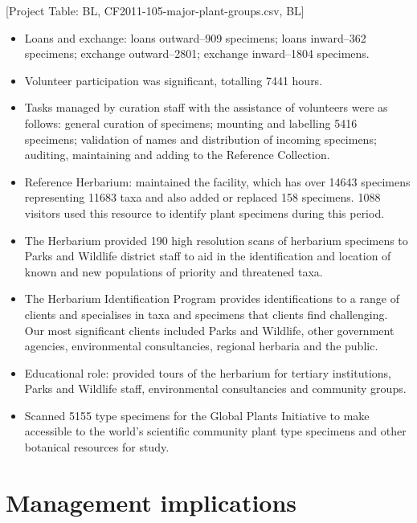 \documentclass[version=last,
    paper=a4, %
    10pt, %
    usenames,
    dvipsnames,
    oneside, %
    headings=openany, %
    DIV=15 %
]{scrbook}
\begin{document}
{[}Project Table: BL, CF2011-105-major-plant-groups.csv, BL{]}

\begin{itemize}
\itemsep1pt\parskip0pt
\item
  Loans and exchange: loans outward--909 specimens; loans inward--362
  specimens; exchange outward--2801; exchange inward--1804 specimens.
\item
  Volunteer participation was significant, totalling 7441 hours.
\item
  Tasks managed by curation staff with the assistance of volunteers were
  as follows: general curation of specimens; mounting and labelling 5416
  specimens; validation of names and distribution of incoming specimens;
  auditing, maintaining and adding to the Reference Collection.
\item
  Reference Herbarium: maintained the facility, which has over 14643
  specimens representing 11683 taxa and also added or replaced 158
  specimens. 1088 visitors used this resource to identify plant
  specimens during this period.
\item
  The Herbarium provided 190 high resolution scans of herbarium
  specimens to Parks and Wildlife district staff to aid in the
  identification and location of known and new populations of priority
  and threatened taxa.
\item
  The Herbarium Identification Program provides identifications to a
  range of clients and specialises in taxa and specimens that clients
  find challenging. Our most significant clients included Parks and
  Wildlife, other government agencies, environmental consultancies,
  regional herbaria and the public.
\item
  Educational role: provided tours of the herbarium for tertiary
  institutions, Parks and Wildlife staff, environmental consultancies
  and community groups.
\item
  Scanned 5155 type specimens for the Global Plants Initiative to make
  accessible to the world's scientific community plant type specimens
  and other botanical resources for study.
\end{itemize}




\section*{Management implications}
\end{document}

